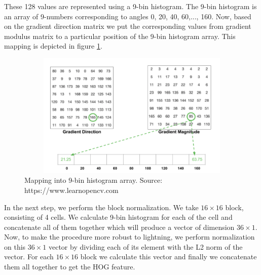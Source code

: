 These 128 values are represented using a 9-bin histogram. The 9-bin histogram is an array of 9-numbers corresponding to angles 0, 20, 40, 60,..., 160. Now, based on the gradient direction matrix we put the corresponding values from gradient modulus matrix to a particular position of the 9-bin histogram array. This mapping is depicted in figure \ref{fig11}.

\begin{figure}[!htbp]
\centerline{\includegraphics[height=60mm,width=120mm]{img/fig11.png}}
\caption{Mapping into 9-bin histogram array. Source: https://www.learnopencv.com}
\label{fig11}
\end{figure}

In the next step, we perform the block normalization. We take $16\times 16$ block, consisting of 4 cells. We calculate 9-bin histogram for each of the cell and concatenate all of them together which will produce a vector of dimension $36\times 1$. Now, to make the procedure more robust to lightning, we perform normalization on this $36\times 1$ vector by dividing each of its element with the L2 norm of the vector. For each $16\times 16$ block we calculate this vector and finally we concatenate them all together to get the HOG feature.


